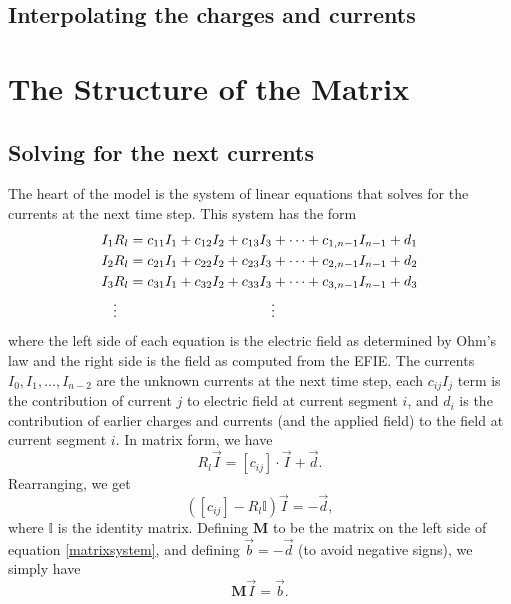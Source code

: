 \documentclass{article}
\newcommand{\mat}{\mathbf}
\begin{document}
\subsection{Interpolating the charges and currents}

\section{The Structure of the Matrix}
\subsection{Solving for the next currents}

The heart of the model is the system of linear equations that solves for the currents at the next time step. This system has the form
\begin{align}
\label{linearsystem}
\begin{split}
I_1R_l &= c_{11}I_1 + c_{12}I_2 + c_{13}I_3 + \cdots + c_{1,n-1}I_{n-1} + d_1 \\
I_2R_l &= c_{21}I_1 + c_{22}I_2 + c_{23}I_3 + \cdots + c_{2,n-1}I_{n-1} + d_2 \\
I_3R_l &= c_{31}I_1 + c_{32}I_2 + c_{33}I_3 + \cdots + c_{3,n-1}I_{n-1} + d_3 \\
\vdotswithin{I_3R_l} & \vdotswithin{= c_{31}I_1 + c_{32}I_2 + c_{33}I_3 + \cdots + c_{3,n-1}I_{n-1} + d_3}
\end{split}
\end{align}
where the left side of each equation is the electric field as determined by Ohm's law and the right side is the field as computed from the EFIE. The currents $I_0, I_1, \ldots, I_{n-2}$ are the unknown currents at the next time step, each $c_{ij}I_j$ term is the contribution of current $j$ to electric field at current segment $i$, and $d_i$ is the contribution of earlier charges and currents (and the applied field) to the field at current segment $i$. In matrix form, we have
\begin{equation}
R_l\vec{I} = \left[c_{ij}\right] \cdot \vec{I} + \vec{d}.
\end{equation}
Rearranging, we get
\begin{equation}
\label{matrixsystem}
\left(\left[c_{ij}\right] - R_l\mathbb{I}\right) \vec{I} = -\vec{d},
\end{equation}
where $\mathbb{I}$ is the identity matrix. Defining $\mat{M}$ to be the matrix on the left side of equation \ref{matrixsystem}, and defining $\vec{b} = -\vec{d}$ (to avoid negative signs), we simply have
\begin{equation}
\label{mib}
\mat{M} \vec{I} = \vec{b}.
\end{equation}
\end{document}
